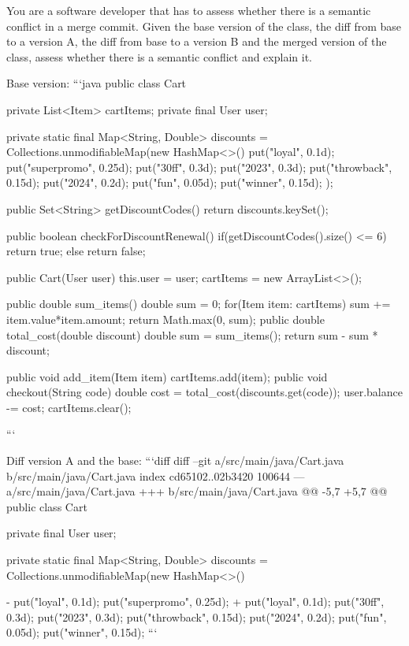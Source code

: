 \begin{prompt}
  You are a software developer that has to assess whether there is a semantic conflict in a merge commit.  Given the base version of the class, the diff from base to a version A, the diff from base to a version B and the merged version of the class, assess whether there is a semantic conflict and explain it.

  Base version:
  ```java
  public class Cart {
      private List<Item> cartItems;
      private final User user;
  
      private static final Map<String, Double> discounts = Collections.unmodifiableMap(new HashMap<>() {{
          put("loyal", 0.1d); put("superpromo", 0.25d);
          put("30ff", 0.3d); put("2023", 0.3d);
          put("throwback", 0.15d); put("2024", 0.2d);
          put("fun", 0.05d); put("winner", 0.15d);
      }});
  
      public Set<String> getDiscountCodes() {
          return discounts.keySet();
      }
  
      public boolean checkForDiscountRenewal() {
          if(getDiscountCodes().size() <= 6)
              return true;
          else
              return false;
      }
  
  
      public Cart(User user) {
          this.user = user;
          cartItems = new ArrayList<>();
      }
  
      public double sum_items() {
          double sum = 0;
          for(Item item: cartItems) {
              sum += item.value*item.amount;
          }
          return Math.max(0, sum);
      }
      public double total_cost(double discount) {
          double sum = sum_items();
          return sum - sum * discount;
      }
  
      public void add_item(Item item) {
          cartItems.add(item);
      }
      public void checkout(String code) {
          double cost = total_cost(discounts.get(code));
          user.balance -= cost;
          cartItems.clear();
      }
  }
  ```
  
  Diff version A and the base:
  ```diff
  diff --git a/src/main/java/Cart.java b/src/main/java/Cart.java
  index cd65102..02b3420 100644
  --- a/src/main/java/Cart.java
  +++ b/src/main/java/Cart.java
  @@ -5,7 +5,7 @@ public class Cart {
       private final User user;
  
       private static final Map<String, Double> discounts = Collections.unmodifiableMap(new HashMap<>() {{
  -        put("loyal", 0.1d); put("superpromo", 0.25d);
  +        put("loyal", 0.1d);
           put("30ff", 0.3d); put("2023", 0.3d);
           put("throwback", 0.15d); put("2024", 0.2d);
           put("fun", 0.05d); put("winner", 0.15d);
  ```
  
}}}
\end{prompt}
